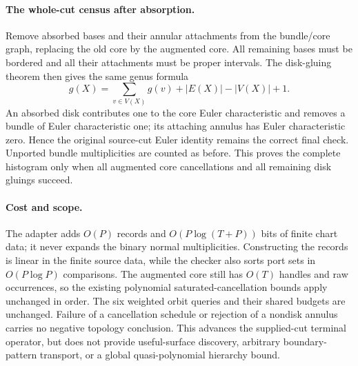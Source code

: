 \paragraph{The whole-cut census after absorption.}
Remove absorbed bases and their annular attachments from the bundle/core
graph, replacing the old core by the augmented core. All remaining bases
must be bordered and all their attachments must be proper intervals.
The disk-gluing theorem then gives the same genus formula
\[
 g(X)=\sum_{v\in V(X)}g(v)+|E(X)|-|V(X)|+1.
\]
An absorbed disk contributes one to the core Euler characteristic and
removes a bundle of Euler characteristic one; its attaching annulus has
Euler characteristic zero. Hence the original source-cut Euler identity
remains the correct final check. Unported bundle multiplicities are counted
as before. This proves the complete histogram only when all augmented core
cancellations and all remaining disk gluings succeed.

\paragraph{Cost and scope.}
The adapter adds $O(P)$ records and $O(P\log(T+P))$ bits of finite chart data;
it never expands the binary normal multiplicities. Constructing the records
is linear in the finite source data, while the checker also sorts port sets
in $O(P\log P)$ comparisons. The augmented core still has $O(T)$ handles and
raw occurrences, so the existing polynomial saturated-cancellation bounds
apply unchanged in order. The six weighted orbit queries and their shared
budgets are unchanged. Failure of a cancellation schedule or rejection of a
nondisk annulus carries no negative topology conclusion. This advances the
supplied-cut terminal operator, but does not provide useful-surface discovery,
arbitrary boundary-pattern transport, or a global quasi-polynomial hierarchy
bound.


